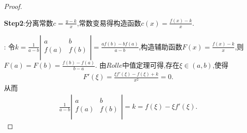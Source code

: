 \documentclass[lang=cn,newtx,10pt,scheme=chinese]{elegantbook}
\begin{document}
\begin{proof}
\begin{note}
        \textbf{Step2}:分离常数$c=\frac{y-k}{x}$,常数变易得构造函数$c\left( x \right) =\frac{f\left( x \right) -k}{x}$.
    \end{note}
    {\color{blue} }:
    令$k=\frac{1}{a-b}\left| \begin{matrix}
        a&		b\\
        f(a)&		f(b)\\
    \end{matrix} \right|=\frac{af\left( b \right) -bf\left( a \right)}{a-b}$,构造辅助函数$F\left( x \right) =\frac{f\left( x \right) -k}{x}$,则$F\left( a \right) =F\left( b \right) =\frac{f\left( b \right) -f\left( a \right)}{b-a}$.
    由$Rolle$中值定理可得,存在$\xi\in(a,b)$,使得
    \begin{align}
        F'\left( \xi \right) =\frac{\xi f'\left( \xi \right) -f\left( \xi \right) +k}{x^2}=0.
        \nonumber
    \end{align}
    从而
    \begin{align}
        \frac{1}{a-b}\left| \begin{matrix}
            a&		b\\
            f(a)&		f(b)\\
        \end{matrix} \right|=k=f\left( \xi \right) -\xi f'\left( \xi \right) .
        \nonumber
    \end{align}
\end{proof}
\end{document}
